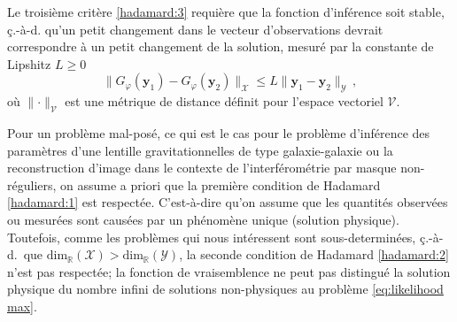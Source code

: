 Le troisième critère \ref{hadamard:3} requière que la fonction d'inférence soit stable, ç.-à-d. qu'un petit changement 
dans le vecteur d'observations devrait correspondre à un petit changement de la solution, mesuré par la constante de Lipshitz
$L \geq 0$
\begin{equation}\label{eq:Lipshitz}
        \lVert G_\varphi(\mathbf{y}_1) - G_\varphi(\mathbf{y}_2)\rVert_{\mathcal{X}} \leq L \lVert \mathbf{y}_1 - \mathbf{y}_2\rVert_{\mathcal{Y}}\, ,
\end{equation}
où $\lVert \cdot \rVert_{\mathcal{V}}$ est une métrique de distance définit pour l'espace vectoriel $\mathcal{V}$.


Pour un problème mal-posé, ce qui est le cas pour le problème d'inférence des paramètres d'une lentille 
gravitationnelles de type galaxie-galaxie ou la reconstruction d'image dans le contexte de l'interférométrie  
par masque non-réguliers, 
on assume a priori que la première condition de Hadamard \ref{hadamard:1} est respectée. C'est-à-dire qu'on assume 
que les quantités observées ou mesurées sont causées par un phénomène unique (solution physique). 
Toutefois, comme les problèmes qui nous intéressent sont sous-determinées, 
ç.-à-d.\ que $\mathrm{dim}_{\mathbb{R}}(\mathcal{X}) > \mathrm{dim}_{\mathbb{R}}(\mathcal{Y})$,
la seconde condition de Hadamard \ref{hadamard:2} n'est pas respectée; la fonction de vraisemblence 
ne peut pas distingué la solution physique du nombre infini de solutions non-physiques au problème \eqref{eq:likelihood max}.

